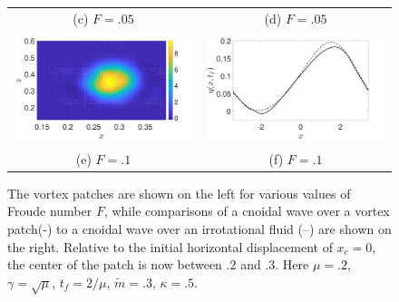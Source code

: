 \documentclass[a4paper,11pt]{article}
\begin{document}
\begin{figure}
\begin{tabular}{cc}
(c)  $F=.05$ & (d)  $F=.05$\\
\includegraphics[width=.45\textwidth]{vorticity_wm_10_modu_pt3} & \includegraphics[width=.45\textwidth]{profiles_wm_10_modu_pt3}\\
(e)  $F=.1$ & (f)  $F=.1$
\end{tabular}
\caption{The vortex patches are shown on the left for various values of Froude number $F$, while comparisons of a cnoidal wave over a vortex patch(-) to a cnoidal wave over an irrotational fluid (--) are shown on the right.  Relative to the initial horizontal displacement of $x_{c}=0$, the center of the patch is now between $.2$ and $.3$.  Here $\mu=.2$, $\gamma=\sqrt{\mu}$, $t_{f}=2/\mu$, $\tilde{m}=.3$, $\kappa = .5$.}
\label{fig:lowsolwave}
\end{figure}
\end{document}
